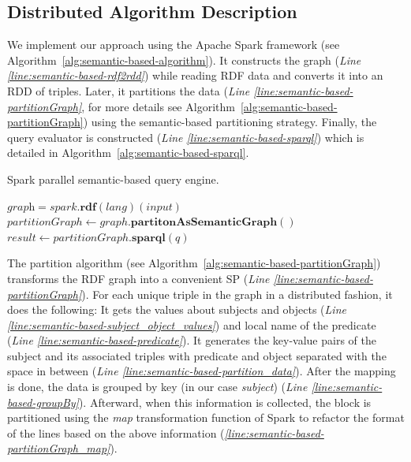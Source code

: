 \subsection{Distributed Algorithm Description}
\label{subsection:semantic-based-algorithm}
We implement our approach using the Apache Spark framework (see Algorithm~\ref{alg:semantic-based-algorithm}). 
It constructs the graph (\textit{Line \ref{line:semantic-based-rdf2rdd}}) while reading RDF data and converts it into an RDD of triples.
Later, it partitions the data (\textit{Line \ref{line:semantic-based-partitionGraph}}, for more details see Algorithm~\ref{alg:semantic-based-partitionGraph}) using the semantic-based partitioning strategy.
Finally, the query evaluator is constructed (\textit{Line \ref{line:semantic-based-sparql}}) which is detailed in Algorithm~\ref{alg:semantic-based-sparql}.

\begin{algorithm*}
\caption{Spark parallel semantic-based query engine.}
\label{alg:semantic-based-algorithm}
    $\textit{graph} = spark.\textbf{rdf}(lang)(input)$ \label{line:semantic-based-rdf2rdd}\\
    $partitionGraph \leftarrow graph.\textbf{partitonAsSemanticGraph}()$ \label{line:semantic-based-partitionGraph}\\
    $result \leftarrow partitionGraph.\textbf{sparql}(q)$ \label{line:semantic-based-sparql}\\
\end{algorithm*}

The partition algorithm (see Algorithm~\ref{alg:semantic-based-partitionGraph}) transforms the RDF graph into a convenient SP (\textit{Line \ref{line:semantic-based-partitionGraph}}).
For each unique triple in the graph in a distributed fashion, it does the following: It gets the values about subjects and objects (\textit{Line \ref{line:semantic-based-subject_object_values}}) and local name of the predicate (\textit{Line \ref{line:semantic-based-predicate}}).
It generates the key-value pairs of the subject and its associated triples with predicate and object separated with the space in between (\textit{Line \ref{line:semantic-based-partition_data}}).
After the mapping is done, the data is grouped by key (in our case \emph{subject}) (\textit{Line \ref{line:semantic-based-groupBy}}).
Afterward, when this information is collected, the block is partitioned using the \emph{map} transformation function of Spark to refactor the format of the lines based on the above information (\textit{\autoref{line:semantic-based-partitionGraph_map}}).

